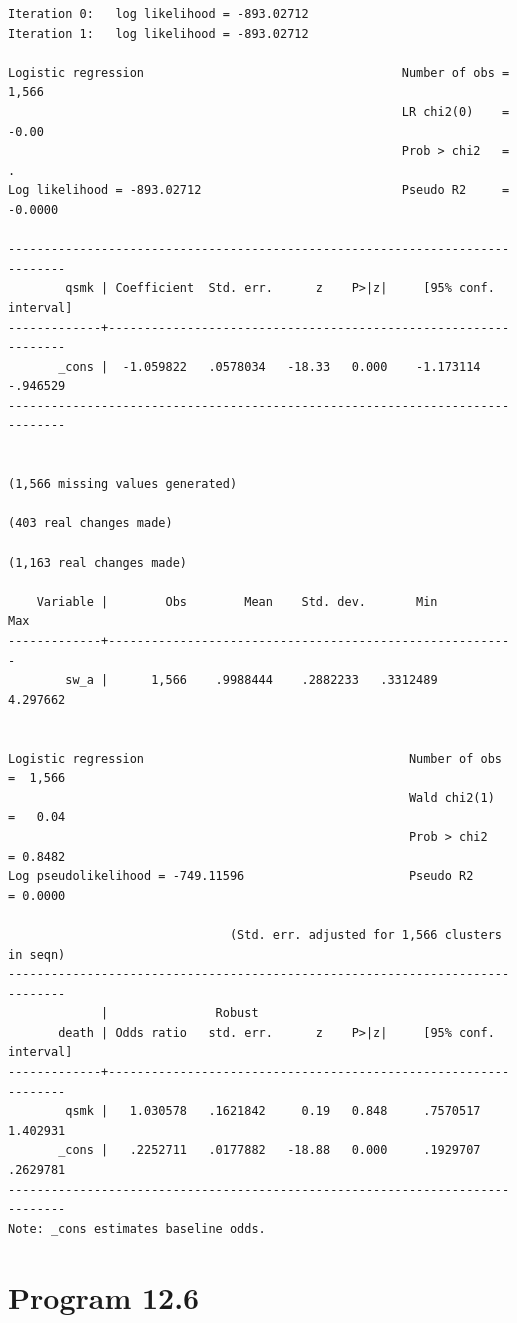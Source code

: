 \documentclass[
  10pt,
  a4paper,
]{book}
\begin{document}
\begin{verbatim}
Iteration 0:   log likelihood = -893.02712  
Iteration 1:   log likelihood = -893.02712  

Logistic regression                                    Number of obs =   1,566
                                                       LR chi2(0)    =   -0.00
                                                       Prob > chi2   =       .
Log likelihood = -893.02712                            Pseudo R2     = -0.0000

------------------------------------------------------------------------------
        qsmk | Coefficient  Std. err.      z    P>|z|     [95% conf. interval]
-------------+----------------------------------------------------------------
       _cons |  -1.059822   .0578034   -18.33   0.000    -1.173114    -.946529
------------------------------------------------------------------------------


(1,566 missing values generated)

(403 real changes made)

(1,163 real changes made)

    Variable |        Obs        Mean    Std. dev.       Min        Max
-------------+---------------------------------------------------------
        sw_a |      1,566    .9988444    .2882233   .3312489   4.297662


Logistic regression                                     Number of obs =  1,566
                                                        Wald chi2(1)  =   0.04
                                                        Prob > chi2   = 0.8482
Log pseudolikelihood = -749.11596                       Pseudo R2     = 0.0000

                               (Std. err. adjusted for 1,566 clusters in seqn)
------------------------------------------------------------------------------
             |               Robust
       death | Odds ratio   std. err.      z    P>|z|     [95% conf. interval]
-------------+----------------------------------------------------------------
        qsmk |   1.030578   .1621842     0.19   0.848     .7570517    1.402931
       _cons |   .2252711   .0177882   -18.88   0.000     .1929707    .2629781
------------------------------------------------------------------------------
Note: _cons estimates baseline odds.
\end{verbatim}

\hypertarget{program-12.6-1}{%
\section{Program 12.6}\label{program-12.6-1}}
\end{document}
